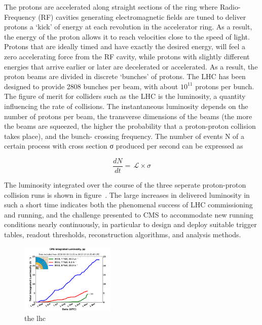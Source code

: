 The protons are accelerated along straight sections of the ring where 
Radio-Frequency (RF) cavities generating electromagnetic fields are 
tuned to deliver protons a ‘kick’ of energy at each revolution in the accelerator ring. 
As a result, the energy of the proton allows it to reach velocities close to the speed
of light. Protons that are ideally timed and have exactly the desired energy, will feel 
a zero accelerating force from the RF cavity, while protons with slightly different 
energies that arrive earlier or later are decelerated or accelerated. As a result, 
the proton beams are divided in discrete ‘bunches’ of protons. The LHC has been designed 
to provide 2808 bunches per beam, with about $10^11$ protons per bunch. The figure of merit 
for colliders such as the LHC is the luminosity, a quantity influencing
the rate of collisions. The instantaneous luminosity depends on the number of protons
per beam, the transverse dimensions of the beams (the more the beams are squeezed,
the higher the probability that a proton-proton collision takes place), and the bunch-
crossing frequency. The number of events N of a certain process with cross section σ
produced per second can be expressed as

\begin{equation}
  \label{eq:lumi}
  \frac{dN}{dt} = \,\mathcal{L} \times \sigma
\end{equation}

The luminosity integrated over the course of the three seperate proton-proton collision runs
is shown in figure~\cite{fig:int_lumi}. The large increases in delivered luminosity in such
a short time indicates both the phenomenal success of LHC commissioning and running, and 
the challenge presented to CMS to accommodate new running conditions nearly continuously, 
in particular to design and deploy suitable trigger tables, readout thresholds, 
reconstruction algorithms, and analysis methods.

\begin{figure}[h!t]
  \begin{center}
      \includegraphics[width=0.40\textwidth,]{figures/int_lumi_cumulative_pp_2.png}
      \caption{\label{fig:int_lumi} the lhc}
  \end{center}
\end{figure}

